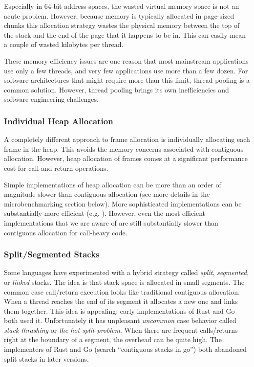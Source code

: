 \documentclass[9pt,preprint]{sigplanconf}
\begin{document}
Especially in 64-bit address spaces, the wasted virtual memory space is not an acute problem.
However, because memory is typically allocated in page-sized chunks this allocation strategy wastes the physical memory between the top of the stack and the end of the page that it happens to be in.
This can easily mean a couple of wasted kilobytes per thread.

These memory efficiency issues are one reason that most mainstream applications use only a few threads, and very few applications use more than a few dozen.
For software architectures that might require more than this limit, thread pooling is a common solution.
However, thread pooling brings its own inefficiencies and software engineering challenges.

\subsubsection{Individual Heap Allocation}

A completely different approach to frame allocation is individually allocating each frame in the heap.
This avoids the memory concerns associated with contiguous allocation.
However, heap allocation of frames comes at a significant performance cost for call and return operations.

Simple implementations of heap allocation can be more than an order of magnitude slower than contiguous allocation (see more details in the microbenchmarking section below).
More sophisticated implementations can be substantially more efficient (e.g. \cite{Shao2000}).
However, even the most efficient implementations that we are aware of are still substantially slower than contiguous allocation for call-heavy code.

\subsubsection{Split/Segmented Stacks}

Some languages have experimented with a hybrid strategy called \emph{split}, \emph{segmented}, or \emph{linked} stacks.
The idea is that stack space is allocated in small segments.
The common case call/return execution looks like traditional contiguous allocation.
When a thread reaches the end of its segment it allocates a new one and links them together.
This idea is appealing: early implementations of Rust and Go both used it.
Unfortunately it has unpleasant \emph{uncommon} case behavior called \emph{stack thrashing} or \emph{the hot split problem}.
When there are frequent calls/returns right at the boundary of a segment, the overhead can be quite high.
The implementers of Rust \cite{Anderson2013} and Go (search ``contiguous stacks in go'') both abandoned split stacks in later versions.
\end{document}
